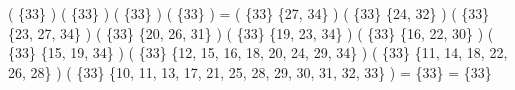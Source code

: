 \documentclass[a4paper,11pt]{article}
\begin{document}
\Big( \{33\} \cap {} \Big) \cup \Big( \{33\} \cap {} \Big) \cup \Big( \{33\} \cap {} \Big) \cup \Big( \{33\} \cap {} \Big) = \Big( \{33\} \cap \{27, 34\} \Big) \cup \Big( \{33\} \cap \{24, 32\} \Big) \cup \Big( \{33\} \cap \{23, 27, 34\} \Big) \cup \Big( \{33\} \cap \{20, 26, 31\} \Big) \cup \Big( \{33\} \cap \{19, 23, 34\} \Big) \cup \Big( \{33\} \cap \{16, 22, 30\} \Big) \cup \Big( \{33\} \cap \{15, 19, 34\} \Big) \cup \Big( \{33\} \cap \{12, 15, 16, 18, 20, 24, 29, 34\} \Big) \cup \Big( \{33\} \cap \{11, 14, 18, 22, 26, 28\} \Big) \cup \Big( \{33\} \cap \{10, 11, 13, 17, 21, 25, 28, 29, 30, 31, 32, 33\} \Big) = \varnothing \cup \varnothing \cup \varnothing \cup \varnothing \cup \varnothing \cup \varnothing \cup \varnothing \cup \varnothing \cup \varnothing \cup \{33\} = \{33\}\\
\end{document}
